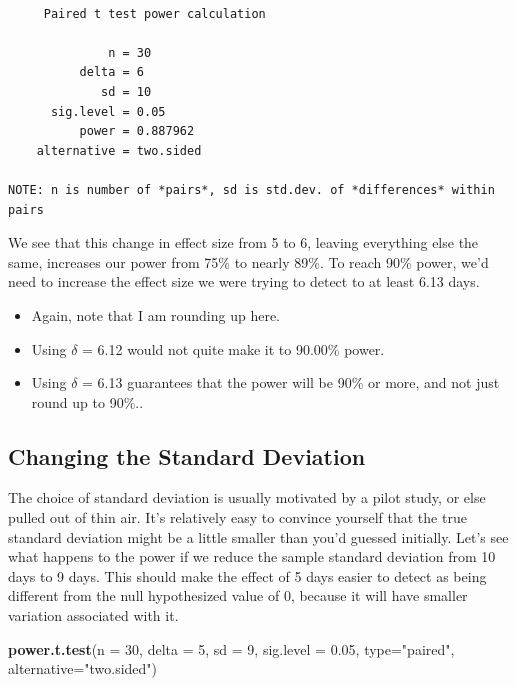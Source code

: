 \documentclass[
]{book}
\newenvironment{Shaded}{\begin{snugshade}}{\end{snugshade}}
\newcommand{\DataTypeTok}[1]{\textcolor[rgb]{0.13,0.29,0.53}{#1}}
\newcommand{\DecValTok}[1]{\textcolor[rgb]{0.00,0.00,0.81}{#1}}
\newcommand{\FloatTok}[1]{\textcolor[rgb]{0.00,0.00,0.81}{#1}}
\newcommand{\KeywordTok}[1]{\textcolor[rgb]{0.13,0.29,0.53}{\textbf{#1}}}
\newcommand{\NormalTok}[1]{#1}
\newcommand{\StringTok}[1]{\textcolor[rgb]{0.31,0.60,0.02}{#1}}
\providecommand{\tightlist}{%
  \setlength{\itemsep}{0pt}\setlength{\parskip}{0pt}}
\begin{document}
\begin{verbatim}

     Paired t test power calculation 

              n = 30
          delta = 6
             sd = 10
      sig.level = 0.05
          power = 0.887962
    alternative = two.sided

NOTE: n is number of *pairs*, sd is std.dev. of *differences* within pairs
\end{verbatim}

We see that this change in effect size from 5 to 6, leaving everything else the same, increases our power from 75\% to nearly 89\%. To reach 90\% power, we'd need to increase the effect size we were trying to detect to at least 6.13 days.

\begin{itemize}
\tightlist
\item
  Again, note that I am rounding up here.
\item
  Using \(\delta\) = 6.12 would not quite make it to 90.00\% power.
\item
  Using \(\delta\) = 6.13 guarantees that the power will be 90\% or more, and not just round up to 90\%..
\end{itemize}

\hypertarget{changing-the-standard-deviation}{%
\subsection{Changing the Standard Deviation}\label{changing-the-standard-deviation}}

The choice of standard deviation is usually motivated by a pilot study, or else pulled out of thin air. It's relatively easy to convince yourself that the true standard deviation might be a little smaller than you'd guessed initially. Let's see what happens to the power if we reduce the sample standard deviation from 10 days to 9 days. This should make the effect of 5 days easier to detect as being different from the null hypothesized value of 0, because it will have smaller variation associated with it.

\begin{Shaded}
\begin{Highlighting}[]
\KeywordTok{power.t.test}\NormalTok{(}\DataTypeTok{n =} \DecValTok{30}\NormalTok{, }\DataTypeTok{delta =} \DecValTok{5}\NormalTok{, }\DataTypeTok{sd =} \DecValTok{9}\NormalTok{, }\DataTypeTok{sig.level =} \FloatTok{0.05}\NormalTok{, }
             \DataTypeTok{type=}\StringTok{"paired"}\NormalTok{, }\DataTypeTok{alternative=}\StringTok{"two.sided"}\NormalTok{)}
\end{Highlighting}
\end{Shaded}
\end{document}
